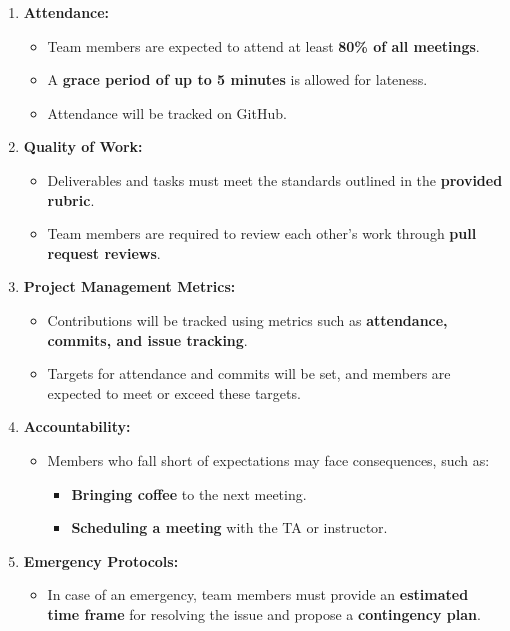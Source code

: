 \documentclass{article}
\begin{document}
\begin{enumerate}
    \item \textbf{Attendance:}
    \begin{itemize}
        \item Team members are expected to attend at least \textbf{80\% of all meetings}.
        \item A \textbf{grace period of up to 5 minutes} is allowed for lateness.
        \item Attendance will be tracked on GitHub.
    \end{itemize}

    \item \textbf{Quality of Work:}
    \begin{itemize}
        \item Deliverables and tasks must meet the standards outlined in the \textbf{provided rubric}.
        \item Team members are required to review each other’s work through \textbf{pull request reviews}.
    \end{itemize}

    \item \textbf{Project Management Metrics:}
    \begin{itemize}
        \item Contributions will be tracked using metrics such as \textbf{attendance, commits, and issue tracking}.
        \item Targets for attendance and commits will be set, and members are expected to meet or exceed these targets.
    \end{itemize}

    \item \textbf{Accountability:}
    \begin{itemize}
        \item Members who fall short of expectations may face consequences, such as:
        \begin{itemize}
            \item \textbf{Bringing coffee} to the next meeting.
            \item \textbf{Scheduling a meeting} with the TA or instructor.
        \end{itemize}
    \end{itemize}

    \item \textbf{Emergency Protocols:}
    \begin{itemize}
        \item In case of an emergency, team members must provide an \textbf{estimated time frame} for resolving the issue and propose a \textbf{contingency plan}.
    \end{itemize}
\end{enumerate}
\end{document}
